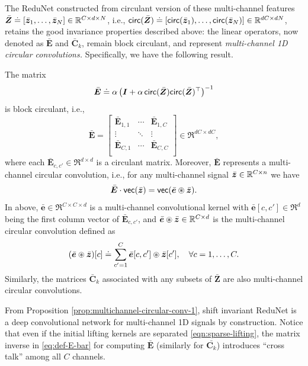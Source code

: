 \documentclass[../../book-main.tex]{subfiles}
\begin{document}
The ReduNet constructed from circulant version of these multi-channel features $\bar{\bm{Z}} \doteq [\bar {\bm{z}}_1, \ldots, \bar {\bm{z}}_N] \in \mathbb{R}^{C \times d \times N}$, i.e., $\mathsf{circ}(\bar{\bm{Z}}) \doteq [ \mathsf{circ}(\bar{\bm{z}}_1), \dots, \mathsf{circ}(\bar{\bm{z}}_N)] \in \mathbb{R}^{dC \times dN}$, retains the good invariance properties described above: the linear operators, now denoted as $\bar{\bm E}$ and $\bar{\bm C}_k$, remain block circulant, and represent {\em multi-channel 1D circular convolutions. }
Specifically, we have the following result.
\begin{proposition}
The matrix 
\begin{equation}
\label{eq:def-E-bar}
\bar{\bm E} \doteq \alpha\left(\bm I + \alpha\, \mathsf{circ}(\bar{\bm{Z}}) \mathsf{circ}(\bar{\bm{Z}})^\top \right) ^{-1}  
\end{equation}
is block circulant, i.e.,
\begin{equation*}
    \bar{\bm E} = 
    \left[\begin{matrix}
        \bar{\bm E}_{1, 1} & \cdots & \bar{\bm E}_{1, C}\\
        \vdots & \ddots & \vdots \\
        \bar{\bm E}_{C, 1} & \cdots & \bar{\bm E}_{C, C}\\
    \end{matrix}\right] \in \Re^{dC \times dC},
\end{equation*}
where each $\bar{\bm E}_{c, c'}\in \Re^{d \times d}$ is a circulant matrix. Moreover, $\bar{\bm E}$ represents a multi-channel circular convolution, i.e., for any multi-channel signal $\bar{\bm{z}} \in \mathbb{R}^{C \times n}$ we have 
$$\bar{\bm E} \cdot \textsf{vec}(\bar{\bm{z}}) = \textsf{vec}( \bar{\bm e} \circledast \bar{\bm{z}}).$$ 
In above, $\bar{\bm e} \in \Re^{C \times C \times d}$ is a multi-channel convolutional kernel with $\bar{\bm e}[c, c'] \in \Re^{d}$ being the first column vector of $\bar{\bm E}_{c, c'}$, and $\bar{\bm e} \circledast \bar{\bm{z}} \in \mathbb{R}^{C \times d}$ is the multi-channel circular convolution defined as
\begin{equation*}
    (\bar{\bm e} \circledast \bar{\bm{z}})[c] \doteq \sum_{c'=1}^C \bar{\bm e}[c, c'] \circledast \bar{\bm{z}}[c'], \quad \forall c = 1, \ldots, C.
\end{equation*}
Similarly, the matrices $\bar{\bm C}_k$ associated with any subsets of $\bar{\bm Z}$ are also multi-channel circular convolutions. 
\label{prop:multichannel-circular-conv-1}
\end{proposition}
From Proposition \ref{prop:multichannel-circular-conv-1}, shift invariant ReduNet is a deep convolutional network for multi-channel 1D signals by construction. Notice that even if the initial lifting kernels are separated \eqref{eqn:sparse-lifting}, the matrix inverse  in \eqref{eq:def-E-bar} for computing $\bar{\bm E}$ (similarly for $\bar{\bm C_k}$) introduces ``cross talk'' among all $C$ channels. %
\end{document}
